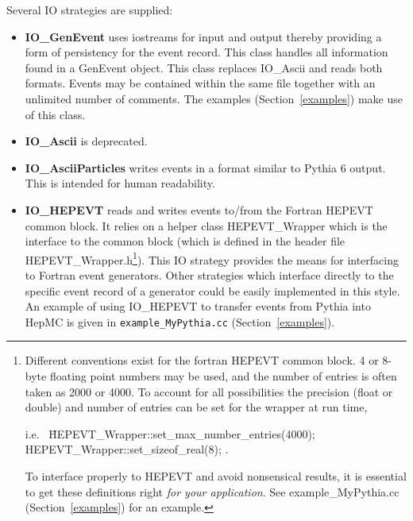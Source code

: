 \documentclass[11pt,letterpaper]{article}
\begin{document}
Several IO strategies are supplied:
\begin{itemize}\setlength{\itemsep}{0pt}
  \item {\bf IO\_GenEvent} uses iostreams for input and output
    thereby providing a form of persistency for the event record. 
    This class handles all information found in a GenEvent object.
    This class replaces IO\_Ascii and reads both formats.
    Events may be contained within the same file together with
    an unlimited number of comments. 
    The examples (Section~\ref{examples}) make use of this class.
  \item {\bf IO\_Ascii} is deprecated.
  \item {\bf IO\_AsciiParticles} writes events in a format similar to 
     Pythia 6 output.  This is intended for human readability.
  \item {\bf IO\_HEPEVT} reads and writes events to/from the Fortran HEPEVT
    common block. It relies on a helper class HEPEVT\_Wrapper which
    is the interface to the common block
    (which is defined in the header file HEPEVT\_Wrapper.h\footnote{
      Different conventions exist for the fortran HEPEVT common
      block. 4 or 8-byte floating point numbers may be used, and the
      number of entries is often taken as 2000 or 4000. To account for
      all possibilities the precision (float or double) and number of
      entries can be set for the wrapper at run time,
      \begin{tabbing}
      i.e.\ \hspace{1cm} \= HEPEVT\_Wrapper::set\_max\_number\_entries(4000);\\
                         \> HEPEVT\_Wrapper::set\_sizeof\_real(8); 
            \hspace{1cm} .
      \end{tabbing}
      To interface properly to HEPEVT and avoid nonsensical
      results, it is essential to get these definitions right
      {\it for your application}. See example\_MyPythia.cc
      (Section~\ref{examples}) for an example.
      }).
    This IO strategy
    provides the means for interfacing to Fortran event
    generators. Other strategies which interface directly to the
    specific event record of a generator could be easily implemented
    in this style. An example of using IO\_HEPEVT to transfer events
    from Pythia into HepMC is given in \verb!example_MyPythia.cc! 
    (Section~\ref{examples}).
\end{itemize}
%
%
\end{document}

